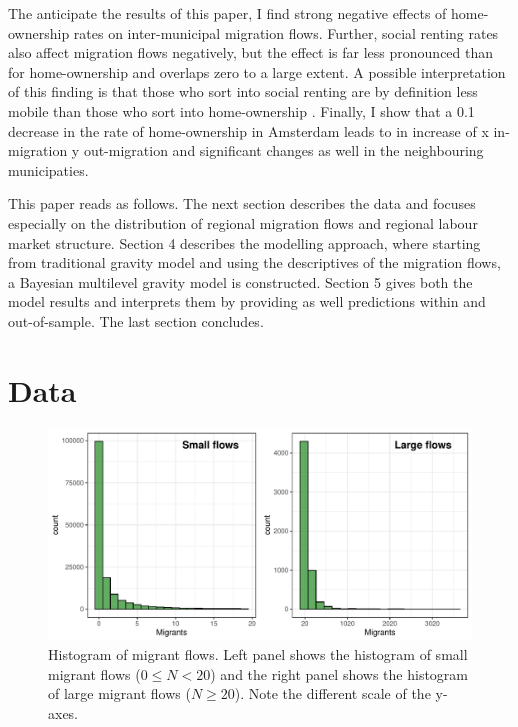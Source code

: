 \documentclass[fleqn,10pt]{SelfArx} %
\begin{document}
        The anticipate the results of this paper, I find strong negative effects
        of home-ownership rates on inter-municipal migration flows. Further,
        social renting rates also affect migration flows negatively, but the
        effect is far less pronounced than for home-ownership and overlaps zero
        to a large extent. A possible interpretation of this finding is that
        those who sort into social renting are by definition less mobile than
        those who sort into home-ownership \citep[this argument is put forward
        by][as well]{boyle1998migration}. Finally, I show that a 0.1 decrease in
        the rate of home-ownership in Amsterdam leads to in increase of x
        in-migration y out-migration and significant changes as well in the
        neighbouring municipaties.

        This paper reads as follows. The next section describes the data and
        focuses especially on the distribution of regional migration flows and
        regional labour market structure. Section 4 describes the modelling
        approach, where starting from traditional gravity model and using the
        descriptives of the migration flows, a Bayesian multilevel gravity model
        is constructed. Section 5 gives both the model results and interprets
        them by providing as well predictions within and out-of-sample. The last
        section concludes.
        
        \section{Data}

        \begin{figure}[t!]\centering %
          \includegraphics[width=0.8\linewidth]{../fig/hist_mig.pdf}
          \caption{Histogram of migrant flows. Left panel shows the
            histogram of small migrant flows ($0 \leq N < 20$) and the right
            panel shows the histogram of large migrant flows
            ($N \geq 20$). Note the different scale of the y-axes.}
          \label{fig:hist_mig}
        \end{figure}
\end{document}
